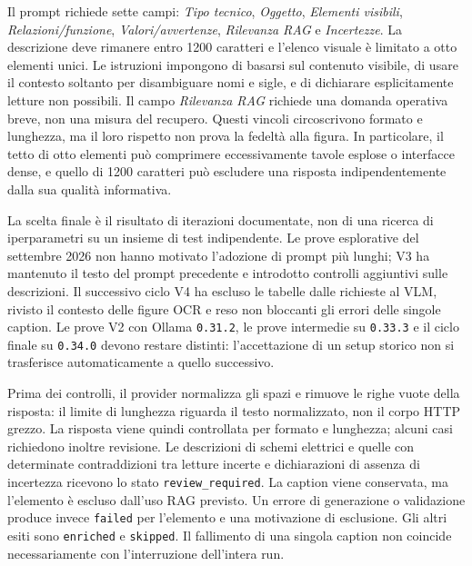 

Il prompt richiede sette campi: \emph{Tipo tecnico}, \emph{Oggetto}, \emph{Elementi visibili}, \emph{Relazioni/funzione}, \emph{Valori/avvertenze}, \emph{Rilevanza RAG} e \emph{Incertezze}. La descrizione deve rimanere entro 1200 caratteri e l'elenco visuale è limitato a otto elementi unici. Le istruzioni impongono di basarsi sul contenuto visibile, di usare il contesto soltanto per disambiguare nomi e sigle, e di dichiarare esplicitamente letture non possibili. Il campo \emph{Rilevanza RAG} richiede una domanda operativa breve, non una misura del recupero. Questi vincoli circoscrivono formato e lunghezza, ma il loro rispetto non prova la fedeltà alla figura. In particolare, il tetto di otto elementi può comprimere eccessivamente tavole esplose o interfacce dense, e quello di 1200 caratteri può escludere una risposta indipendentemente dalla sua qualità informativa.

La scelta finale è il risultato di iterazioni documentate, non di una ricerca di iperparametri su un insieme di test indipendente. Le prove esplorative del settembre 2026 non hanno motivato l'adozione di prompt più lunghi; V3 ha mantenuto il testo del prompt precedente e introdotto controlli aggiuntivi sulle descrizioni. Il successivo ciclo V4 ha escluso le tabelle dalle richieste al VLM, rivisto il contesto delle figure OCR e reso non bloccanti gli errori delle singole caption. Le prove V2 con Ollama \texttt{0.31.2}, le prove intermedie su \texttt{0.33.3} e il ciclo finale su \texttt{0.34.0} devono restare distinti: l'accettazione di un setup storico non si trasferisce automaticamente a quello successivo.

Prima dei controlli, il provider normalizza gli spazi e rimuove le righe vuote della risposta: il limite di lunghezza riguarda il testo normalizzato, non il corpo HTTP grezzo. La risposta viene quindi controllata per formato e lunghezza; alcuni casi richiedono inoltre revisione. Le descrizioni di schemi elettrici e quelle con determinate contraddizioni tra letture incerte e dichiarazioni di assenza di incertezza ricevono lo stato \texttt{review\_required}. La caption viene conservata, ma l'elemento è escluso dall'uso RAG previsto. Un errore di generazione o validazione produce invece \texttt{failed} per l'elemento e una motivazione di esclusione. Gli altri esiti sono \texttt{enriched} e \texttt{skipped}. Il fallimento di una singola caption non coincide necessariamente con l'interruzione dell'intera run.

